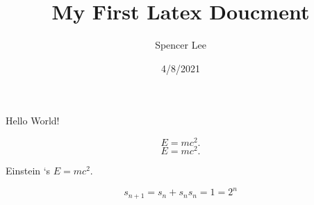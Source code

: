 \documentclass{article}
\title{My First Latex Doucment}
\author{Spencer Lee}
\date{4/8/2021}
\begin{document}
\maketitle
\tableofcontents

Hello World! 

\[ E=mc^2. \]   %
\[E=mc^2.\]

Einstein `s $E=mc^2$.



\begin{displaymath}
  s_{n+1} = s_{n} + s_{n}  
  s_{n} =1=2^{n}
\end{displaymath}
\end{document}
